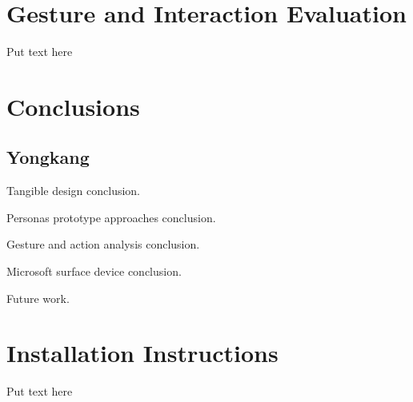 \documentclass{tei2013}
\begin{document}
\section{Gesture and Interaction Evaluation}
Put text here


\section{Conclusions}
\subsection{Yongkang}
Tangible design conclusion.

Personas prototype approaches conclusion.

Gesture and action analysis conclusion.

Microsoft surface device conclusion.

Future work.

\appendix
\section{Installation Instructions}
Put text here




\end{document}
